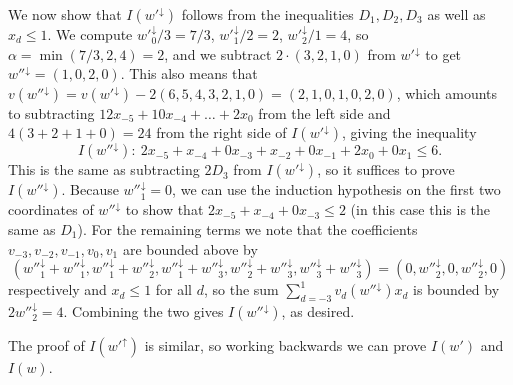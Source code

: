 \documentclass[letterpaper,reqno,11pt]{amsart}
\begin{document}
\begin{example}
    We now show that $I(w'^{\downarrow})$ follows from the inequalities $D_1, D_2, D_3$ as well as $x_d\leq 1$. We compute $w'^{\downarrow}_0/3 = 7/3$, $w'^{\downarrow}_1/2 = 2$, $w'^{\downarrow}_2/1 = 4$, so $\alpha = \min(7/3, 2, 4) = 2$, and we subtract $2\cdot (3,2,1,0)$ from $w'^{\downarrow}$ to get $w''^{\downarrow} = (1,0,2,0)$. This also means that $v(w''^{\downarrow}) = v(w'^{\downarrow}) - 2(6,5,4,3,2, 1,0) = (2, 1, 0, 1, 0, 2, 0)$, which amounts to subtracting $12x_{-5}+10x_{-4}+\dots+2x_0$ from the left side and $4(3+2+1+0)=24$ from the right side of $I(w'^{\downarrow})$, giving the inequality \[I(w''^{\downarrow}):\ 2x_{-5}+x_{-4}+0x_{-3}+x_{-2}+0x_{-1}+2x_0 + 0x_1 \leq 6.\] This is the same as subtracting $2D_3$ from $I(w'^{\downarrow})$, so it suffices to prove $I(w''^{\downarrow})$. 
    Because $w''^{\downarrow}_1 = 0$, we can use the induction hypothesis on the first two coordinates of $w''^{\downarrow}$ to show that $2x_{-5}+x_{-4}+0x_{-3} \leq 2$ (in this case this is the same as $D_1$). For the remaining terms we note that the coefficients $v_{-3}, v_{-2}, v_{-1}, v_0, v_1$ are bounded above by \[(w''^{\downarrow}_1+w''^{\downarrow}_1, w''^{\downarrow}_1+w''^{\downarrow}_2, w''^{\downarrow}_1+w''^{\downarrow}_3, w''^{\downarrow}_2+w''^{\downarrow}_3, w''^{\downarrow}_3+w''^{\downarrow}_3) = (0, w''^{\downarrow}_2, 0, w''^{\downarrow}_2, 0)\] respectively and $x_d\leq 1$ for all $d$, so the sum $\sum_{d=-3}^{1} v_d(w''^{\downarrow})x_d$ is bounded by $2w''^{\downarrow}_2 = 4$. Combining the two gives $I(w''^{\downarrow})$, as desired. 
    
    The proof of $I(w'^{\uparrow})$ is similar, so working backwards we can prove $I(w')$ and $I(w)$.
\end{example}
\end{document}

